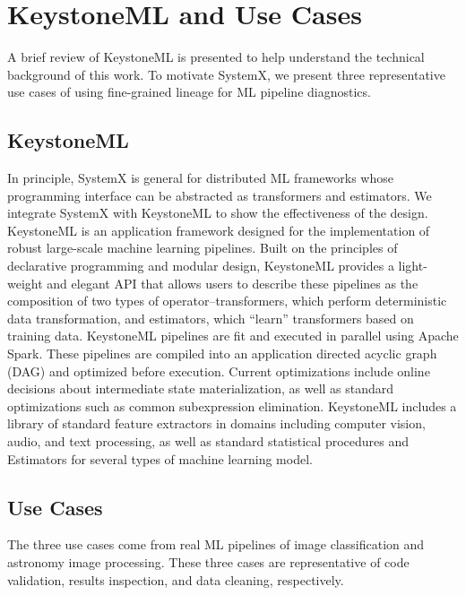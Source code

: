 \documentclass{sig-alternate}
\begin{document}
\section{K\MakeLowercase{eystone}ML and Use Cases}
\label{sec:Background}
A brief review of KeystoneML is presented to help understand the technical background of this work.
To motivate SystemX, we present three representative use cases of using fine-grained lineage for ML pipeline diagnostics.

\subsection{KeystoneML}
In principle, SystemX is general for distributed ML frameworks whose programming interface can be abstracted as transformers and estimators.
We integrate SystemX with KeystoneML to show the effectiveness of the design.
KeystoneML is an application framework designed for the implementation of robust large-scale machine learning pipelines. Built on the principles of declarative programming and modular design, KeystoneML provides a light-weight and elegant API that allows users to describe these pipelines as the composition of two types of operator--transformers, which perform deterministic data transformation, and estimators, which ``learn'' transformers based on training data. KeystoneML pipelines are fit and executed in parallel using Apache Spark. These pipelines are compiled into an application directed acyclic graph (DAG) and optimized before execution. Current optimizations include online decisions about intermediate state materialization, as well as standard optimizations such as common subexpression elimination. KeystoneML includes a library of standard feature extractors in domains including computer vision, audio, and text processing, as well as standard statistical procedures and Estimators for several types of machine learning model.

\subsection{Use Cases}
\label{sec:Back-cases}
The three use cases come from real ML pipelines of image classification and astronomy image processing. 
These three cases are representative of code validation, results inspection, and data cleaning, respectively.
\end{document}
